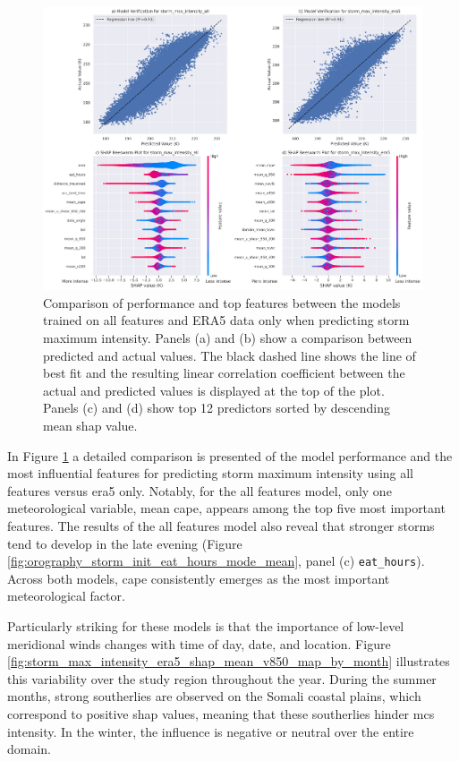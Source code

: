 \begin{figure}[ht]
    \centering
    \includegraphics[width=\textwidth]{../figures/generated/experiments/storm_max_intensity/storm_max_intensity_summary.png}
    \caption{Comparison of performance and top features between the models trained on all features and ERA5 data only when predicting storm maximum intensity. Panels (a) and (b) show a comparison between predicted and actual values. The black dashed line shows the line of best fit and the resulting linear correlation coefficient between the actual and predicted values is displayed at the top of the plot. Panels (c) and (d) show top 12 predictors sorted by descending mean \acrshort{shap} value.}
    \label{fig:storm_max_intensity_summary}
\end{figure}

In Figure \ref{fig:storm_max_intensity_summary} a detailed comparison is presented of the model performance and the most influential features for predicting storm maximum intensity using all features versus \acrshort{era5} only. Notably, for the all features model, only one meteorological variable, mean \acrshort{cape}, appears among the top five most important features. The results of the all features model also reveal that stronger storms tend to develop in the late evening (Figure \ref{fig:orography_storm_init_eat_hours_mode_mean}, panel (c) \texttt{eat\_hours}). Across both models, \acrshort{cape} consistently emerges as the most important meteorological factor.

Particularly striking for these models is that the importance of low-level meridional winds changes with time of day, date, and location. Figure \ref{fig:storm_max_intensity_era5_shap_mean_v850_map_by_month} illustrates this variability over the study region throughout the year. During the summer months, strong southerlies are observed on the Somali coastal plains, which correspond to positive \acrshort{shap} values, meaning that these southerlies hinder \acrshort{mcs} intensity. In the winter, the influence is negative or neutral over the entire domain.

